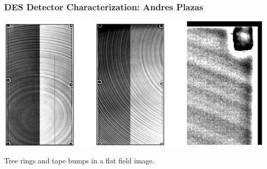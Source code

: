 \documentclass{beamer}
\begin{document}
\frame
{
    \frametitle{DES Detector Characterization: Andres Plazas}

    \includegraphics[width=\textwidth]{flats.png}
    \newline

    \begin{center}
        Tree rings and tape bumps in a flat field image.
    \end{center}
} 
\frame
\end{document}
